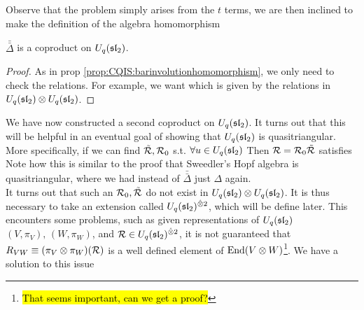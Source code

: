 \documentclass{article}
\begin{document}
Observe that the problem simply arises from the $t$ terms, we are then inclined to make the definition of the algebra homomorphism

\begin{prop}
$\bar{\bar{\Delta}}$ is a coproduct on $U_q(\mathfrak{sl}_2)$. 
\end{prop}
\begin{proof}
As in prop \ref{prop:CQIS:barinvolutionhomomorphism}, we only need to check the relations. For example, we want 
which is given by the relations in $ U_q(\mathfrak{sl}_2) \otimes U_q(\mathfrak{sl}_2)$. 
\end{proof}

We have now constructed a second coproduct on $U_q(\mathfrak{sl}_2)$. It turns out that this will be helpful in an eventual goal of showing that $U_q(\mathfrak{sl}_2)$ is quasitriangular. More specifically, if we can find $\tilde{\mathcal{R}}, \mathcal{R}_0$ s.t. $\forall u \in U_q(\mathfrak{sl}_2)$
Then $\mathcal{R} = \mathcal{R}_0 \tilde{\mathcal{R}}$ satisfies
Note how this is similar to the proof that Sweedler's Hopf algebra is quasitriangular, where we had instead of $\bar{\bar{\Delta}}$ just $\Delta$ again. \\
It turns out that such an $\mathcal{R}_0, \tilde{\mathcal{R}}$ do not exist in $U_q(\mathfrak{sl}_2) \otimes U_q(\mathfrak{sl}_2)$. It is thus necessary to take an extension called $U_q(\mathfrak{sl}_2)^{\hat{\otimes}2}$, which will be define later. This encounters some problems, such as given representations of $U_q(\mathfrak{sl}_2)$ $(V,\pi_V), \, (W,\pi_W)$, and $\mathcal{R} \in U_q(\mathfrak{sl}_2)^{\hat{\otimes}2}$, it is not guaranteed that $R_{VW} \equiv (\pi_V \otimes \pi_W)(\mathcal{R})$ is a well defined element of $\operatorname{End}(V \otimes W)$\footnote{\hl{That seems important, can we get a proof?}}. We have a solution to this issue
\end{document}
